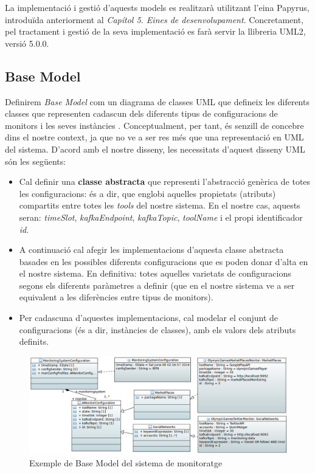 La implementació i gestió d'aquests models es realitzarà utilitzant l'eina Papyrus, introduïda anteriorment al \textit{Capítol 5. Eines de desenvolupament}. Concretament, pel tractament i gestió de la seva implementació es farà servir la llibreria UML2, versió 5.0.0.

\subsection{Base Model}

Definirem \textit{Base Model} com un diagrama de classes UML que defineix les diferents classes que representen cadascun dels diferents tipus de configuracions de monitors i les seves instàncies \cite{base}. Conceptualment, per tant, és senzill de concebre dins el nostre context, ja que no ve a ser res més que una representació en UML del sistema. D'acord amb el nostre disseny, les necessitats d'aquest disseny UML són les següents: 

\begin{itemize}
\item Cal definir una \textbf{classe abstracta} que representi l'abstracció genèrica de totes les configuracions: és a dir, que englobi aquelles propietats (atributs) compartits entre totes les \textit{tools} del nostre sistema. En el nostre cas, aquests seran: \textit{timeSlot}, \textit{kafkaEndpoint}, \textit{kafkaTopic}, \textit{toolName} i el propi identificador \textit{id}.
\item A continuació cal afegir les implementacions d'aquesta classe abstracta basades en les possibles diferents configuracions que es poden donar d'alta en el nostre sistema. En definitiva: totes aquelles varietats de configuracions segons els diferents paràmetres a definir (que en el nostre sistema ve a ser equivalent a les diferències entre tipus de monitors).
\item Per cadascuna d'aquestes implementacions, cal modelar el conjunt de configuracions (és a dir, instàncies de classes), amb els valors dels atributs definits.
\end{itemize}

\begin{figure}
\centering
\includegraphics[width=13cm]{Figures/Figure16}
\decoRule
\caption{Exemple de Base Model del sistema de monitoratge}
\label{fig:Figura16}
\end{figure}

